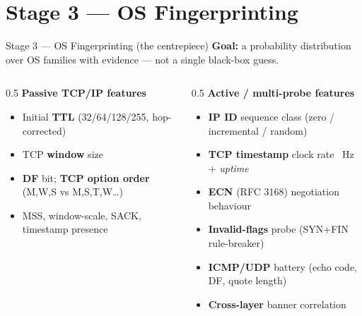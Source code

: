 \documentclass[10pt,aspectratio=169]{beamer}
\begin{document}
\section{Stage 3 --- OS Fingerprinting}
\begin{frame}{Stage 3 --- OS Fingerprinting (the centrepiece)}
  \textbf{Goal:} a \alert{probability distribution} over OS families with
  evidence --- not a single black-box guess.
  \begin{columns}[T]
    \begin{column}{0.5\textwidth}
      \textbf{Passive TCP/IP features}
      \begin{itemize}
        \item Initial \textbf{TTL} (32/64/128/255, hop-corrected)
        \item TCP \textbf{window} size
        \item \textbf{DF} bit; \textbf{TCP option order} (M,W,S vs M,S,T,W\dots)
        \item MSS, window-scale, SACK, timestamp presence
      \end{itemize}
    \end{column}
    \begin{column}{0.5\textwidth}
      \textbf{Active / multi-probe features}
      \begin{itemize}
        \item \textbf{IP ID} sequence class (zero / incremental / random)
        \item \textbf{TCP timestamp} clock rate \textrightarrow\ Hz + \emph{uptime}
        \item \textbf{ECN} (RFC 3168) negotiation behaviour
        \item \textbf{Invalid-flags} probe (SYN+FIN rule-breaker)
        \item \textbf{ICMP/UDP} battery (echo code, DF, quote length)
        \item \textbf{Cross-layer} banner correlation
      \end{itemize}
    \end{column}
  \end{columns}
\end{frame}
\end{document}
